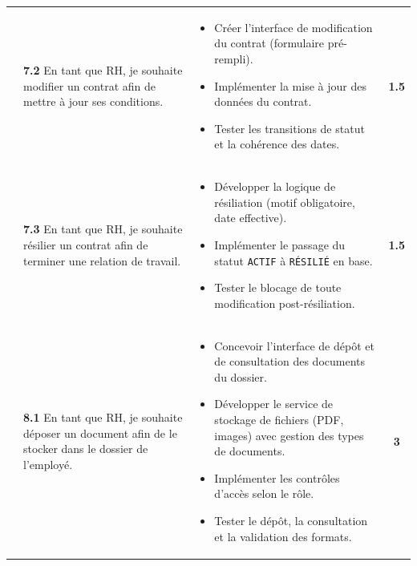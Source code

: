 \begin{small}
\begin{longtable}{|p{2.5cm}|p{6.0cm}|p{6.0cm}|c|}
& \textbf{7.2} En tant que RH, je souhaite modifier un contrat afin
  de mettre à jour ses conditions.
& \begin{itemize}[leftmargin=*, noitemsep, topsep=0pt]
    \item Créer l'interface de modification du contrat (formulaire
          pré-rempli).
    \item Implémenter la mise à jour des données du contrat.
    \item Tester les transitions de statut et la cohérence des dates.
  \end{itemize}
& \textbf{1.5} \\ 

& \textbf{7.3} En tant que RH, je souhaite résilier un contrat afin
  de terminer une relation de travail.
& \begin{itemize}[leftmargin=*, noitemsep, topsep=0pt]
    \item Développer la logique de résiliation (motif obligatoire,
          date effective).
    \item Implémenter le passage du statut \texttt{ACTIF} à
          \texttt{RÉSILIÉ} en base.
    \item Tester le blocage de toute modification post-résiliation.
  \end{itemize}
& \textbf{1.5} \\ \hline

& \textbf{8.1} En tant que RH, je souhaite déposer un document afin
  de le stocker dans le dossier de l'employé.
& \begin{itemize}[leftmargin=*, noitemsep, topsep=0pt]
    \item Concevoir l'interface de dépôt et de consultation des
          documents du dossier.
    \item Développer le service de stockage de fichiers (PDF, images)
          avec gestion des types de documents.
    \item Implémenter les contrôles d'accès selon le rôle.
    \item Tester le dépôt, la consultation et la validation des formats.
  \end{itemize}
& \textbf{3} \\ \hline

\end{longtable}
\end{small}
\renewcommand{\arraystretch}{1.0}
\normalsize

